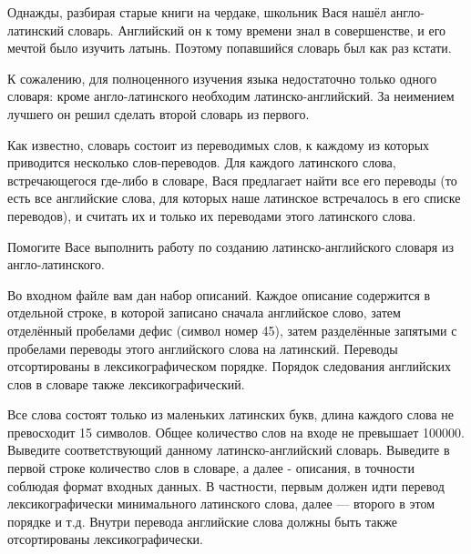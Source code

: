 
Однажды, разбирая старые книги на чердаке, школьник Вася нашёл англо-латинский словарь. Английский он к тому времени знал в совершенстве, и его мечтой было изучить латынь. Поэтому попавшийся словарь был как раз кстати.

К сожалению, для полноценного изучения языка недостаточно только одного словаря: кроме англо-латинского необходим латинско-английский. За неимением лучшего он решил сделать второй словарь из первого.

Как известно, словарь состоит из переводимых слов, к каждому из которых приводится несколько слов-переводов. Для каждого латинского слова, встречающегося где-либо в словаре, Вася предлагает найти все его переводы (то есть все английские слова, для которых наше латинское встречалось в его списке переводов), и считать их и только их переводами этого латинского слова.

Помогите Васе выполнить работу по созданию латинско-английского словаря из англо-латинского.

\InputFile
Во входном файле вам дан набор описаний. Каждое описание содержится в отдельной строке, в которой записано сначала английское слово, затем отделённый пробелами дефис (символ номер 45), затем разделённые запятыми с пробелами переводы этого английского слова на латинский. Переводы отсортированы в лексикографическом порядке. Порядок следования английских слов в словаре также лексикографический.

Все слова состоят только из маленьких латинских букв, длина каждого слова не превосходит 15 символов. Общее количество слов на входе не превышает 100000.
\OutputFile
Выведите соответствующий данному латинско-английский словарь. Выведите в первой строке количество слов в словаре, а далее - описания, в точности соблюдая формат входных данных. В частности, первым должен идти перевод лексикографически минимального латинского слова, далее — второго в этом порядке и т.д. Внутри перевода английские слова должны быть также отсортированы лексикографически. 


